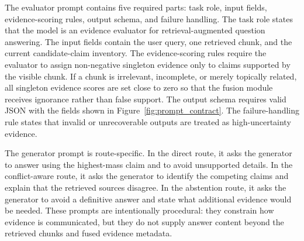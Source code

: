 \documentclass[preprint,12pt,authoryear,nopreprintline]{elsarticle}
\begin{document}
The evaluator prompt contains five required parts: task role, input fields, evidence-scoring rules, output schema, and failure handling. The task role states that the model is an evidence evaluator for retrieval-augmented question answering. The input fields contain the user query, one retrieved chunk, and the current candidate-claim inventory. The evidence-scoring rules require the evaluator to assign non-negative singleton evidence only to claims supported by the visible chunk. If a chunk is irrelevant, incomplete, or merely topically related, all singleton evidence scores are set close to zero so that the fusion module receives ignorance rather than false support. The output schema requires valid JSON with the fields shown in Figure~\ref{fig:prompt_contract}. The failure-handling rule states that invalid or unrecoverable outputs are treated as high-uncertainty evidence.

The generator prompt is route-specific. In the direct route, it asks the generator to answer using the highest-mass claim and to avoid unsupported details. In the conflict-aware route, it asks the generator to identify the competing claims and explain that the retrieved sources disagree. In the abstention route, it asks the generator to avoid a definitive answer and state what additional evidence would be needed. These prompts are intentionally procedural: they constrain how evidence is communicated, but they do not supply answer content beyond the retrieved chunks and fused evidence metadata.



\end{document}
